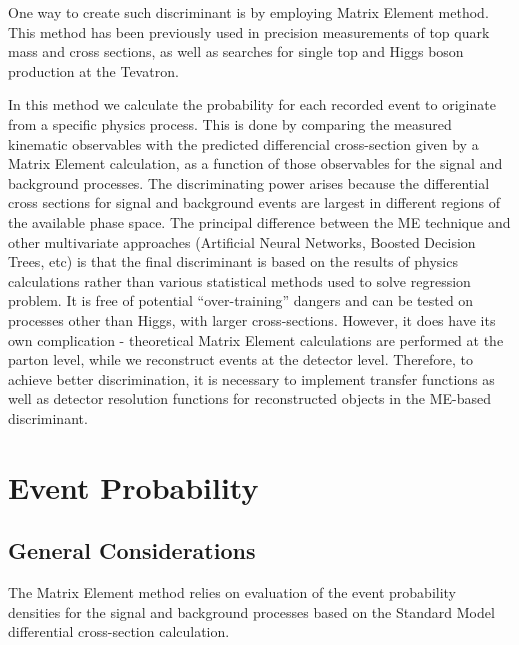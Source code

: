 \documentclass{cmspaper}
\begin{document}
One way to create such discriminant is by employing Matrix Element method. This method has been previously used in precision measurements of 
top quark mass and cross sections, as well as searches for single top and Higgs boson production at the Tevatron.

In this method we calculate the probability for each 
recorded event to originate from a specific physics process. This is done by comparing the measured kinematic observables with the predicted 
differencial cross-section given by a Matrix Element calculation, as a function of those observables for the signal and background processes.
The discriminating power arises because the differential cross sections for signal and background events are largest in different regions
of the available phase space. The principal difference between the ME technique and other multivariate approaches (Artificial Neural Networks,
 Boosted Decision Trees, etc) is that the final discriminant is based on the results of physics calculations rather than various statistical
 methods used to solve regression problem. It is free of potential ``over-training'' dangers and can be tested on processes other than Higgs,
with larger cross-sections. However, it does have its own complication - theoretical Matrix Element calculations are performed at the 
parton level, while we reconstruct events at the detector level. Therefore, to achieve better discrimination, it is necessary to implement
transfer functions as well as detector resolution functions for reconstructed objects in the ME-based discriminant.

\section{Event Probability}
\subsection{General Considerations}
The Matrix Element method relies on evaluation of the event probability densities for the signal and background processes based on the 
Standard Model differential cross-section calculation. 
\end{document}
